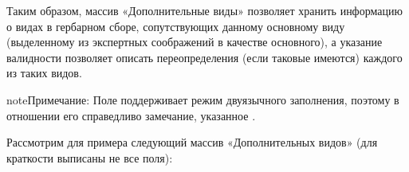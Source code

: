 \documentclass[letterpaper,10pt,russian]{sphinxmanual}
\begin{document}
Таким образом, массив «Дополнительные виды» позволяет хранить информацию о видах в гербарном сборе,
сопутствующих данному основному виду (выделенному из экспертных соображений в качестве основного),
а указание валидности позволяет описать переопределения (если таковые имеются) каждого из таких видов.

\begin{sphinxadmonition}{note}{Примечание:}
Поле  поддерживает режим двуязычного заполнения, поэтому в
отношении его справедливо замечание, указанное {\hyperref[\detokenize{http_api:field-reference-label}]{}}.
\end{sphinxadmonition}


Рассмотрим для примера следующий массив «Дополнительных видов» (для краткости выписаны не все поля):
\end{document}
